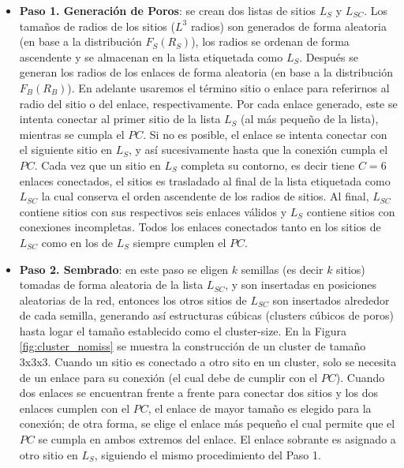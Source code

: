 \begin{itemize}
\item[] \textbf{Paso 1. Generación de Poros}: se crean dos listas de sitios $L_{S}$ y $L_{SC}$. Los tamaños de radios de los sitios ($L^3$ radios)
son generados de forma aleatoria (en base a la distribución $F_S(R_S)$), los radios se ordenan de forma ascendente y se almacenan en la lista 
etiquetada como $L_{S}$. 
Después se generan los radios de los enlaces  de forma aleatoria (en base a la distribución $F_B(R_B)$). En adelante usaremos el t\'ermino 
sitio o enlace para referirnos al radio del sitio o del enlace, respectivamente. Por cada enlace generado, 
este se intenta conectar al primer sitio de la lista $L_{S}$ (al m\'as pequeño de la lista), mientras se cumpla el $PC$. Si no es posible, 
el enlace se intenta conectar con el siguiente sitio en $L_{S}$, y así sucesivamente hasta que la conexión cumpla el $PC$. Cada vez que 
un sitio en $L_{S}$ completa su contorno, es decir tiene $C=6$ enlaces conectados, el sitios es trasladado al final de la lista etiquetada 
como $L_{SC}$ la cual conserva el orden ascendente de los radios de sitios. Al final, $L_{SC}$ contiene sitios 
con sus respectivos seis enlaces válidos y $L_{S}$ contiene sitios con conexiones incompletas. Todos los enlaces conectados 
tanto en los sitios de $L_{SC}$ como en los de $L_{S}$ siempre cumplen el $PC$.\\

\item[] \textbf{Paso 2. Sembrado}: en este paso se eligen $k$ semillas (es decir $k$ sitios) tomadas de forma aleatoria de la lista $L_{SC}$, y 
son insertadas en posiciones aleatorias de la red, entonces los otros sitios de $L_{SC}$ son insertados alrededor de cada semilla, generando
así estructuras cúbicas (clusters c\'ubicos de poros) hasta logar el tamaño establecido como el cluster-size. En la Figura \ref{fig:cluster_nomiss}  se muestra la 
construcción de un cluster de tamaño 3x3x3. Cuando un sitio es conectado a otro sito en un cluster, solo se 
necesita de un enlace para su conexión (el cual debe de cumplir con el $PC$). Cuando dos enlaces se encuentran frente a frente para conectar 
dos sitios y los dos enlaces cumplen con el $PC$, el enlace de mayor tama\~no es elegido para la conexi\'on; de otra forma, se elige el enlace 
m\'as pequeño el cual permite que el $PC$ se cumpla en ambos extremos del enlace. El enlace sobrante es asignado a otro sitio en $L_{S}$, 
siguiendo el mismo procedimiento del Paso 1.\\


\end{itemize}
